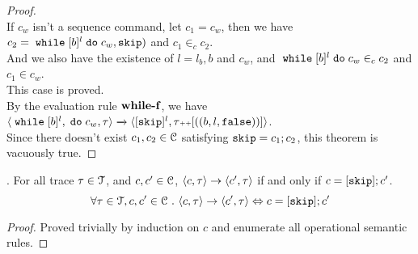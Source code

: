 \begin{proof}
		\\
		If $c_w$ isn't a sequence command, let $c_1 = c_w$, then we have $c_2 = \;\mathtt{while}\; [b]^{l} \;\mathtt{do}\; c_w,  \mathtt{skip})$ 
		and $c_1 \in_c c_2$.
		\\
		And we also have the existence of $l = l_b, b$ and $c_w$, and $\;\mathtt{while}\; [b]^{l} \;\mathtt{do}\; c_w \in_c c_2$ and  $c_1 \in c_w$.
		\\
		This case is proved.
		\\
		By the evaluation rule $\rname{while-f}$, we have
		$
		{
			\langle {\;\ensuremath{\mathtt{while}}\;[b]^{l}, \;\ensuremath{\mathtt{do}}\;c_w, \ensuremath{\mathtt{\tau}}} \rangle
			\xrightarrow{} 
			\langle {
			[\ensuremath{\mathtt{skip}}]^l ,
			\ensuremath{\mathtt{\tau}}{\scriptscriptstyle ++}[((b, l, \ensuremath{\mathtt{false}}))]} \rangle
		}$.
		\\
		Since there doesn't exist $c_1, c_2 \in \mathcal{C}$ satisfying $\mathtt{skip} = c_1; c_2$, this theorem is vacuously true.
	\end{proof}
%
%
\begin{lem}.
	\label{lem:inv_skip}
	For all trace $\mathtt{\tau}\in \mathcal{T}$, and $c, c' \in \mathcal{C}$,  
	$\langle c, \mathtt{\tau} \rangle \rightarrow \langle c', \mathtt{\tau} \rangle$ if and only if $c = [\mathtt{skip}];c'$. 
	\[
		\forall \mathtt{\tau}\in \mathcal{T}, c, c' \in \mathcal{C} ~.~
		\langle c, \mathtt{\tau} \rangle \rightarrow \langle c', \mathtt{\tau} \rangle
		\Leftrightarrow 
		c = [\mathtt{skip}];c'
	\]
	\end{lem}
\begin{proof}
	Proved trivially by induction on $c$ and enumerate all operational semantic rules.
\end{proof}
